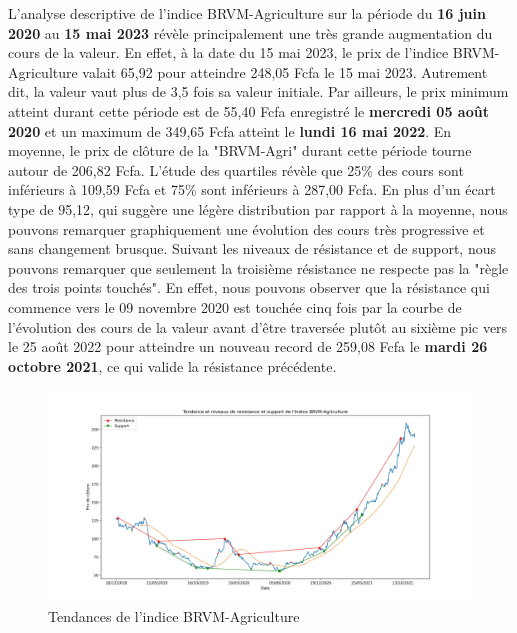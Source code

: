 \begin{itemize}
  {L'analyse descriptive de l'indice BRVM-Agriculture sur la période du
  \textbf{16 juin 2020} au \textbf{15 mai 2023} révèle principalement
  une très grande augmentation du cours de la valeur. En effet, à la
  date du 15 mai 2023, le prix de l'indice BRVM-Agriculture valait 65,92
  pour atteindre 248,05 Fcfa le 15 mai 2023. Autrement dit, la valeur
  vaut plus de 3,5 fois sa valeur initiale. Par ailleurs, le prix
  minimum atteint durant cette période est de 55,40 Fcfa enregistré le
  \textbf{mercredi 05 août 2020} et un maximum de 349,65 Fcfa atteint le
  \textbf{lundi 16 mai 2022}. En moyenne, le prix de clôture de la
  "BRVM-Agri" durant cette période tourne autour de 206,82 Fcfa. L'étude
  des quartiles révèle que 25\% des cours sont inférieurs à 109,59 Fcfa
  et 75\% sont inférieurs à 287,00 Fcfa. En plus d'un écart type de
  95,12, qui suggère une légère distribution par rapport à la moyenne,
  nous pouvons remarquer graphiquement une évolution des cours très
  progressive et sans changement brusque. Suivant les niveaux de
  résistance et de support, nous pouvons remarquer que seulement la
  troisième résistance ne respecte pas la "règle des trois points
  touchés". En effet, nous pouvons observer que la résistance qui
  commence vers le 09 novembre 2020 est touchée cinq fois par la courbe
  de l'évolution des cours de la valeur avant d'être traversée plutôt au
  sixième pic vers le 25 août 2022 pour atteindre un nouveau record de
  259,08 Fcfa le \textbf{mardi 26 octobre 2021}, ce qui valide la
  résistance précédente.}

  \begin{figure}
  \hypertarget{fig:Tendanceux20deux20lux27indiceux20BRVM-Agriculture}{%
  \centering
  \includegraphics{img/agri_tendance.jpg}
  \caption{Tendances de l'indice
  BRVM-Agriculture}\label{fig:Tendanceux20deux20lux27indiceux20BRVM-Agriculture}
  }
  \end{figure}
\end{itemize}

